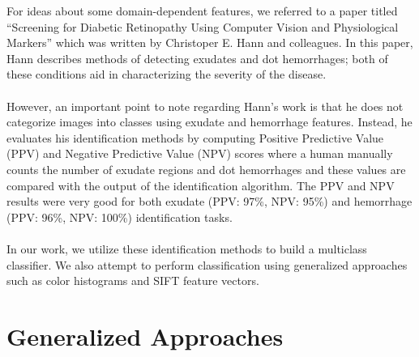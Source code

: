 \documentclass{article} %
\begin{document}
\begin{figure}[H]
	\centering
\end{figure} 
For ideas about some domain-dependent features, we referred to a paper titled ``Screening for Diabetic Retinopathy Using Computer Vision and Physiological Markers'' which was written by Christoper E. Hann and colleagues. In this paper, Hann describes methods of detecting exudates and dot hemorrhages; both of these conditions aid in characterizing the severity of the disease. \\ \\
However, an important point to note regarding Hann's work is that he does not categorize images into classes using exudate and hemorrhage features. Instead, he evaluates his identification methods by computing Positive Predictive Value (PPV) and Negative Predictive Value (NPV) scores where a human manually counts the number of exudate regions and dot hemorrhages and these values are compared with the output of the identification algorithm. The PPV and NPV results were very good for both exudate (PPV: 97\%, NPV: 95\%) and hemorrhage (PPV: 96\%, NPV: 100\%) identification tasks. \\ \\
In our work, we utilize these identification methods to build a multiclass classifier. We also attempt to perform classification using generalized approaches such as color histograms and SIFT feature vectors.

\section{Generalized Approaches}
\end{document}
